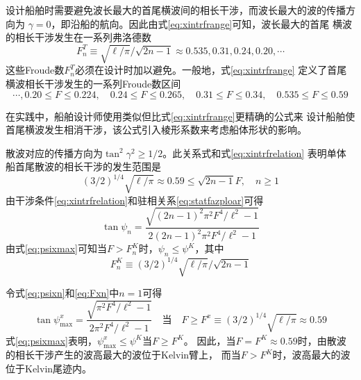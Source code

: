设计船舶时需要避免波长最大的首尾横波间的相长干涉，而波长最大的波的传播方向为
$\gamma=0$，即沿船的航向。因此由式\eqref{eq:xintrfrange}可知，波长最大的首尾
横波的相长干涉发生在一系列弗洛德数
\begin{equation}
  F_n^T\equiv\sqrt{\ell/\pi}/\sqrt{2n-1}\approx 0.535,0.31,0.24,0.20,\cdots
  \label{eq:FnT}
\end{equation}
这些Froude数$F_n^T$必须在设计时加以避免。一般地，式\eqref{eq:xintrfrange}
定义了首尾横波相长干涉发生的一系列Froude数区间
\begin{equation}
  \cdots,0.20\le F\le0.224, \quad 0.24\le F\le 0.265,\quad 0.31\le F\le 0.34,
  \quad 0.535\le F\le 0.59
  \label{FnTrange}
\end{equation}

在实践中，船舶设计师使用类似但比式\eqref{eq:xintrfrange}更精确的公式来
设计船舶使首尾横波发生相消干涉，该公式引入棱形系数来考虑船体形状的影响。

散波对应的传播方向为$\tan^2\gamma^2\ge 1/2$。此关系式和式\eqref{eq:xintrfrelation}
表明单体船首尾散波的相长干涉的发生范围是
\begin{equation}
  (3/2)^{1/4}\sqrt{\ell/\pi}\approx 0.59\le\sqrt{2n-1}F,\quad n\ge 1
  \label{eq:xdivintrfrange}
\end{equation}
由干涉条件\eqref{eq:xintrfrelation}和驻相关系\eqref{eq:statfazploar}可得
\begin{equation}
  \tan\psi_n=\frac{\sqrt{(2n-1)^2\pi^2F^4/\ell^2-1}}{2(2n-1)^2\pi^2F^4/\ell^2-1}
  \label{eq:psixn}
\end{equation}
由式\eqref{eq:psixmax}可知当$F>F_n^K$时，$\psi_n\le\psi^K$，其中
\begin{equation}
  F_n^K\equiv (3/2)^{1/4}\sqrt{\ell/\pi}/\sqrt{2n-1}
  \label{eq:Fxn}
\end{equation}

令式\eqref{eq:psixn}和\eqref{eq:Fxn}中$n=1$可得
\begin{equation}
  \tan\psi^x_{\max}=\frac{\sqrt{\pi^2F^4/\ell^2-1}}{2\pi^2F^4/\ell^2-1}
  \quad\text{当}\quad F\ge F^x\equiv (3/2)^{1/4}\sqrt{\ell/\pi}\approx 0.59
  \label{eq:psixmax}
\end{equation}
式\eqref{eq:psixmax}表明，$\psi^x_{\max}\le\psi^K$当$F\ge F^K$。
因此，当$F=F^K\approx0.59$时，由散波的相长干涉产生的波高最大的波位于Kelvin臂上，
而当$F>F^K$时，波高最大的波位于Kelvin尾迹内。

